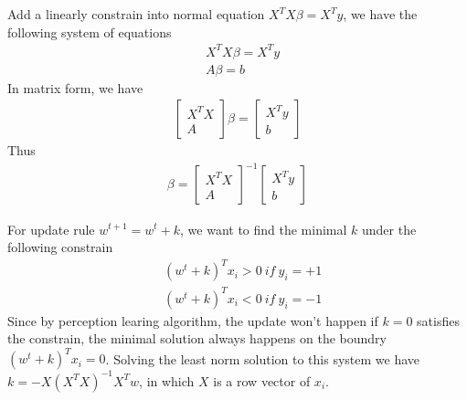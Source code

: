 \documentclass[12pt]{article}
\newenvironment{problem}[2][Problem]{\begin{trivlist}
\item[\hskip \labelsep {\bfseries #1}\hskip \labelsep {\bfseries #2}]}{\end{trivlist}}
\begin{document}
\begin{problem}{3. Linearly Constrained Linear Regression}
\item{}
Add a linearly constrain into normal equation $X^TX\beta = X^Ty$, we have the following system of equations
\begin{align*}
	&X^TX\beta = X^Ty\\
	&A\beta = b
\end{align*}
In matrix form, we have
\begin{align*}
\begin{bmatrix}
	X^TX \\
	A
\end{bmatrix}
\beta = 
\begin{bmatrix}
	X^Ty \\
	b
\end{bmatrix}
\end{align*}
Thus 
\begin{align*}
\beta = 
\begin{bmatrix}
	X^TX \\
	A
\end{bmatrix}^{-1}
\begin{bmatrix}
	X^Ty \\
	b
\end{bmatrix}
\end{align*}
\end{problem}

\begin{problem}{4. Onine Learning}
	For update rule $w^{t+1} = w^t + k$, we want to find the minimal $k$ under the following constrain 
\begin{align*}
	& (w^t+k)^Tx_i > 0 \ if \ y_i = +1\\
	& (w^t+k)^Tx_i < 0 \ if \ y_i = -1
\end{align*}
Since by perception learing algorithm, the update won't happen if $k=0$ satisfies the constrain, the minimal solution always happens on the boundry $(w^t + k)^Tx_i = 0$.
Solving the least norm solution to this system we have $k = -X(X^TX)^{-1}X^Tw$, in which $X$ is a row vector of $x_i$.
\end{problem}

 
\end{document}
